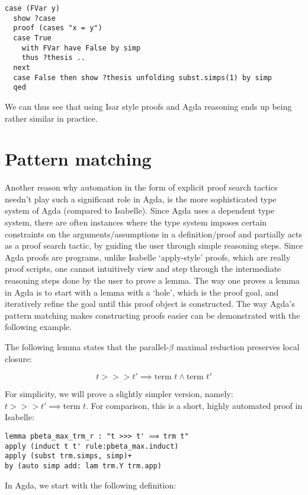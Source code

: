 \documentclass[a4paper, 12pt, twoside]{style/ociamthesis}
\theoremstyle{plain}
\theoremstyle{definition}
\theoremstyle{remark}
\begin{document}
\begin{verbatim}
case (FVar y)
  show ?case
  proof (cases "x = y")
  case True
    with FVar have False by simp
    thus ?thesis ..
  next
  case False then show ?thesis unfolding subst.simps(1) by simp
  qed
\end{verbatim}

We can thus see that using Isar style proofs and Agda reasoning ends up
being rather similar in practice.

\section{Pattern matching}\label{pattern-matching}

Another reason why automation in the form of explicit proof search
tactics needn't play such a significant role in Agda, is the more
sophisticated type system of Agda (compared to Isabelle). Since Agda
uses a dependent type system, there are often instances where the type
system imposes certain constraints on the arguments/assumptions in a
definition/proof and partially acts as a proof search tactic, by guiding
the user through simple reasoning steps. Since Agda proofs are programs,
unlike Isabelle `apply-style' proofs, which are really proof scripts,
one cannot intuitively view and step through the intermediate reasoning
steps done by the user to prove a lemma. The way one proves a lemma in
Agda is to start with a lemma with a `hole', which is the proof goal,
and iteratively refine the goal until this proof object is constructed.
The way Agda's pattern matching makes constructing proofs easier can be
demonstrated with the following example.

The following lemma states that the parallel-\(\beta\) maximal reduction
preserves local closure:

\[t >>> t' \implies \text{term }t \land \text{term }t'\]

For simplicity, we will prove a slightly simpler version, namely:
\(t >>> t' \implies \text{term }t\). For comparison, this is a short,
highly automated proof in Isabelle:

\begin{verbatim}
lemma pbeta_max_trm_r : "t >>> t' ⟹ trm t"
apply (induct t t' rule:pbeta_max.induct)
apply (subst trm.simps, simp)+
by (auto simp add: lam trm.Y trm.app)
\end{verbatim}

In Agda, we start with the following definition:
\end{document}
